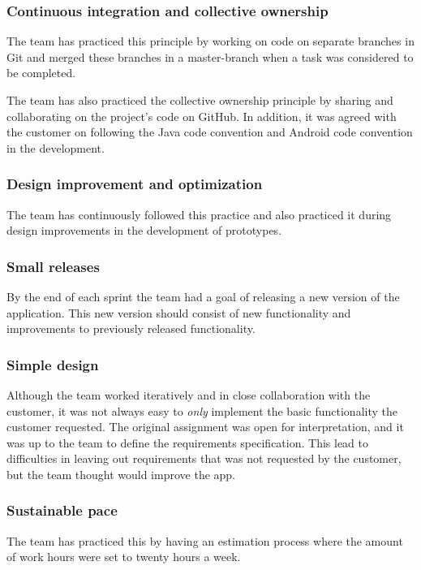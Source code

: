 \subsubsection{Continuous integration and collective ownership}
The team has practiced this principle by working on code on separate branches in Git and merged these branches in a master-branch when a task was considered to be completed.

The team has also practiced the collective ownership principle by sharing and collaborating on the project's code on GitHub. In addition, it was agreed with the customer on following the Java code convention and Android code convention in the development.

\subsubsection{Design improvement and optimization}
The team has continuously followed this practice and also practiced it during design improvements in the development of prototypes.
 
\subsubsection{Small releases}
By the end of each sprint the team had a goal of releasing a new version of the application. This new version should consist of new functionality and improvements to previously released functionality.

\subsubsection{Simple design}
Although the team worked iteratively and in close collaboration with the customer, it was not always easy to \emph{only} implement the basic functionality the customer requested. The original assignment was open for interpretation, and it was up to the team to define the requirements specification. This lead to difficulties in leaving out requirements that was not requested by the customer, but the team thought would improve the app.

\subsubsection{Sustainable pace}
The team has practiced this by having an estimation process where the amount of work hours were set to twenty hours a week.

